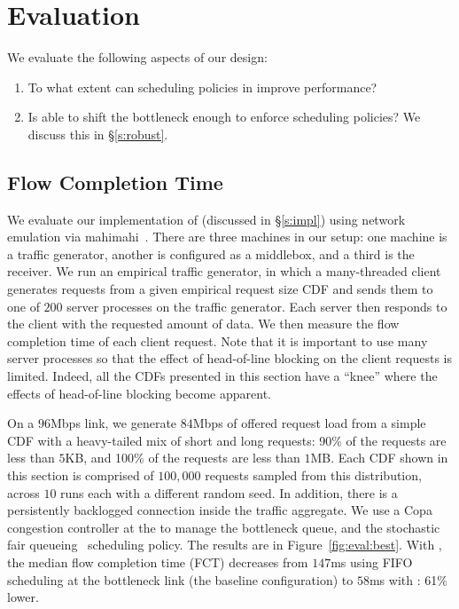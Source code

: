 \section{Evaluation}\label{s:eval}

We evaluate the following aspects of our design:
\begin{enumerate}
    \item To what extent can scheduling policies in \name improve performance?
    \item Is \name able to shift the bottleneck enough to enforce scheduling policies? We discuss this in \S\ref{s:robust}.
\end{enumerate}

\subsection{Flow Completion Time}\label{s:eval:fct}



We evaluate our implementation of \name (discussed in \S\ref{s:impl}) using network emulation via mahimahi~\cite{mahimahi}.
There are three machines in our setup: one machine is a traffic generator, another is configured as a middlebox, and a third is the receiver.
We run an empirical traffic generator, in which a many-threaded client generates requests from a given empirical request size CDF and sends them to one of $200$ server processes on the traffic generator.
Each server then responds to the client with the requested amount of data.
We then measure the flow completion time of each client request.
Note that it is important to use many server processes so that the effect of head-of-line blocking on the client requests is limited.
Indeed, all the CDFs presented in this section have a ``knee'' where the effects of head-of-line blocking become apparent.

On a $96$Mbps link, we generate $84$Mbps of offered request load from a simple CDF with a heavy-tailed mix of short and long requests: 90\% of the requests are less than $5$KB, and 100\% of the requests are less than $1$MB. 
Each CDF shown in this section is comprised of $100,000$ requests sampled from this distribution, across $10$ runs each with a different random seed.
In addition, there is a persistently backlogged connection inside the traffic aggregate.
We use a Copa~\cite{copa} congestion controller at the \inbox to manage the bottleneck queue, and the stochastic fair queueing~\cite{sfq} scheduling policy. 
The results are in Figure~\ref{fig:eval:best}.
With \name, the median flow completion time (FCT) decreases from $147$ms using FIFO scheduling at the bottleneck link (the baseline configuration) to $58$ms with \name: 61\% lower.

